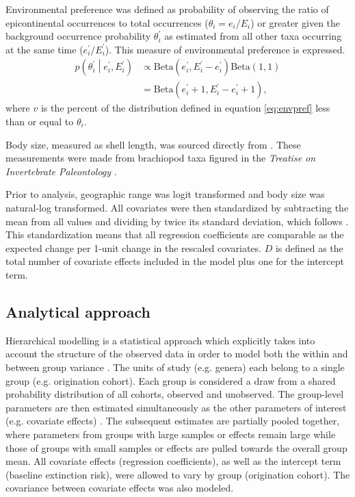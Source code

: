\documentclass{article}
\begin{document}
Environmental preference was defined as probability of observing the ratio of epicontinental occurrences to total occurrences (\(\theta_{i} = e_{i} / E_{i}\)) or greater given the background occurrence probability \(\theta^{\prime}_{i}\) as estimated from all other taxa occurring at the same time (\(e^{\prime}_{i} / E^{\prime}_{i}\)). This measure of environmental preference is expressed.
\begin{equation}
  \begin{aligned}
    p\left(\theta^{\prime}_{i} \middle| e^{\prime}_{i}, E^{\prime}_{i} \right) &\propto \mathrm{Beta}(e^{\prime}_{i}, E^{\prime}_{i} - e^{\prime}_{i}) \mathrm{Beta}(1, 1) \\
    &= \mathrm{Beta}(e^{\prime}_{i} + 1, E^{\prime}_{i} - e^{\prime}_{i} + 1),
  \end{aligned}
  \label{eq:envpref}
\end{equation}
where \(v\) is the percent of the distribution defined in equation \ref{eq:envpref} less than or equal to \(\theta_{i}\).

Body size, measured as shell length, was sourced directly from \citet{Payne2014}. These measurements were made from brachiopod taxa figured in the \textit{Treatise on Invertebrate Paleontology} \citep{Brunton2007}.

Prior to analysis, geographic range was logit transformed and body size was natural-log transformed. All covariates were then standardized by subtracting the mean from all values and dividing by twice its standard deviation, which follows \citet{Gelman2007}. This standardization means that all regression coefficients are comparable as the expected change per 1-unit change in the rescaled covariates. \(D\) is defined as the total number of covariate effects included in the model plus one for the intercept term.


\subsection{Analytical approach}

Hierarchical modelling is a statistical approach which explicitly takes into account the structure of the observed data in order to model both the within and between group variance \citep{Gelman2013d,Gelman2007}. The units of study (e.g. genera) each belong to a single group (e.g. origination cohort). Each group is considered a draw from a shared probability distribution of all cohorts, observed and unobserved. The group-level parameters are then estimated simultaneously as the other parameters of interest (e.g. covariate effects) \citep{Gelman2013d}. The subsequent estimates are partially pooled together, where parameters from groups with large samples or effects remain large while those of groups with small samples or effects are pulled towards the overall group mean. All covariate effects (regression coefficients), as well as the intercept term (baseline extinction risk), were allowed to vary by group (origination cohort). The covariance between covariate effects was also modeled. 
\end{document}

